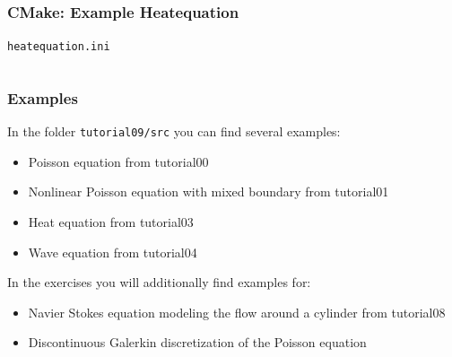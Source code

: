 \documentclass[aspectratio=169,11pt]{beamer}
\theoremstyle{definition}
\begin{document}
\begin{frame}
  \frametitle{CMake: Example Heatequation}
  \lstinline{heatequation.ini}
  \inputminted[fontsize=\tiny]{ini}{../src/heatequation.ini}
\end{frame}

\begin{frame}[fragile]
  \frametitle{Examples}
  In the folder \lstinline{tutorial09/src} you can find several examples:
  \begin{itemize}
  \item Poisson equation from tutorial00
  \item Nonlinear Poisson equation with mixed boundary from tutorial01
  \item Heat equation from tutorial03
  \item Wave equation from tutorial04
  \end{itemize}

  In the exercises you will additionally find examples for:
  \begin{itemize}
  \item Navier Stokes equation modeling the flow around a cylinder from tutorial08
  \item Discontinuous Galerkin discretization of the Poisson equation
  \end{itemize}
\end{frame}
\end{document}
